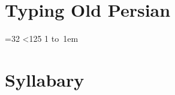 \documentclass{article}
\begin{document}
    \section{Typing Old Persian}

    \begin{multicols}{4}
        =32
        \loop\ifnum{}<125
        \advance{} 1
        \hbox{\hbox to 1em{\hss}\hbox{\oldpersian{}}}
        \repeat
    \end{multicols}

    \section{Syllabary}
\end{document}
